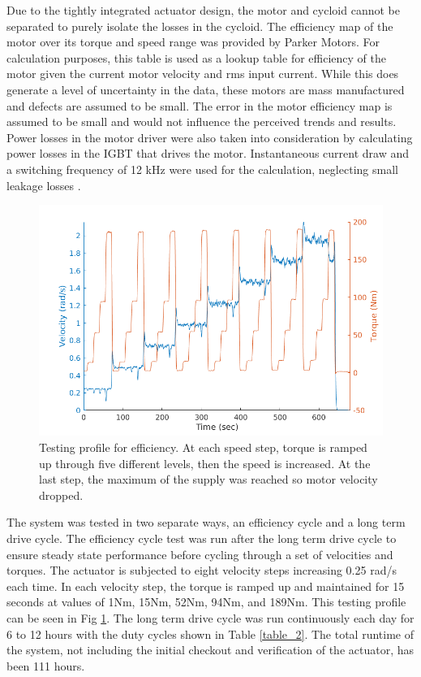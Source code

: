 Due to the tightly integrated actuator design, the motor and cycloid cannot be separated to purely isolate the losses in the cycloid.
The efficiency map of the motor over its torque and speed range was provided by Parker Motors.
For calculation purposes, this table is used as a lookup table for efficiency of the motor given the current motor velocity and rms input current.
While this does generate a level of uncertainty in the data, these motors are mass manufactured and defects are assumed to be small.
The error in the motor efficiency map is assumed to be small and would not influence the perceived trends and results.
Power losses in the motor driver were also taken into consideration by calculating power losses in the IGBT that drives the motor.
Instantaneous current draw and a switching frequency of 12 kHz were used for the calculation, neglecting small leakage losses \cite{IGBTPower}.

\begin{figure}[!b]
   \centering
   \includegraphics[width=\linewidth]{images/eff_test_profile_v4}
   \caption{Testing profile for efficiency.
   At each speed step, torque is ramped up through five different levels, then the speed is increased.
   At the last step, the maximum of the supply was reached so motor velocity dropped.}
   \label{eff_profile}
\end{figure}

The system was tested in two separate ways, an efficiency cycle and a long term drive cycle.
The efficiency cycle test was run after the long term drive cycle to ensure steady state performance before cycling through a set of velocities and torques.
The actuator is subjected to eight velocity steps increasing 0.25 rad/s each time.
In each velocity step, the torque is ramped up and maintained for 15 seconds at values of 1Nm, 15Nm, 52Nm, 94Nm, and 189Nm.
This testing profile can be seen in Fig \ref{eff_profile}.
The long term drive cycle was run continuously each day for 6 to 12 hours with the duty cycles shown in Table \ref{table_2}.
The total runtime of the system, not including the initial checkout and verification of the actuator, has been 111 hours.

